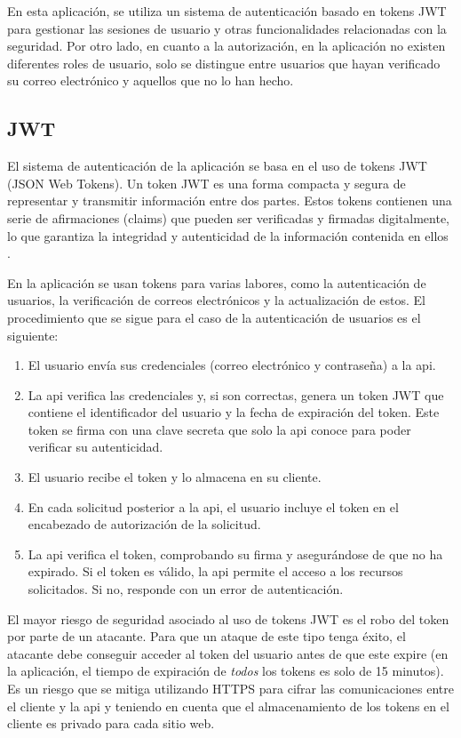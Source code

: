 En esta aplicación, se utiliza un sistema de autenticación basado en tokens JWT para gestionar las
sesiones de usuario y otras funcionalidades relacionadas con la seguridad. Por otro lado, en
cuanto a la autorización, en la aplicación no existen diferentes roles de usuario, solo se
distingue entre usuarios que hayan verificado su correo electrónico y aquellos que no lo han hecho.

\subsection{JWT}
\label{anexo4:sec:jwt}
El sistema de autenticación de la aplicación se basa en el uso de tokens JWT (JSON Web Tokens).
Un token JWT es una forma compacta y segura de representar y transmitir información entre dos
partes. Estos tokens contienen una serie de afirmaciones (claims) que pueden ser verificadas y
firmadas digitalmente, lo que garantiza la integridad y autenticidad de la información contenida
en ellos \parencite{rfc7519}.

En la aplicación se usan tokens para varias labores, como la autenticación de usuarios, la
verificación de correos electrónicos y la actualización de estos. El procedimiento que se sigue
para el caso de la autenticación de usuarios es el siguiente:
\begin{enumerate}
    \item El usuario envía sus credenciales (correo electrónico y contraseña) a la \gls{api}.
    \item La \gls{api} verifica las credenciales y, si son correctas, genera un token JWT que contiene
          el identificador del usuario y la fecha de expiración del token. Este token se firma
          con una clave secreta que solo la \gls{api} conoce para poder verificar su autenticidad.
    \item El usuario recibe el token y lo almacena en su cliente.
    \item En cada solicitud posterior a la \gls{api}, el usuario incluye el token en el encabezado de
          autorización de la solicitud.
    \item La \gls{api} verifica el token, comprobando su firma y asegurándose de que no ha expirado. Si
          el token es válido, la \gls{api} permite el acceso a los recursos solicitados. Si no, responde
          con un error de autenticación.
\end{enumerate}

El mayor riesgo de seguridad asociado al uso de tokens JWT es el robo del token
por parte de un atacante. Para que un ataque de este tipo tenga éxito, el
atacante debe conseguir acceder al token del usuario antes de que este expire
(en la aplicación, el tiempo de expiración de \textit{todos} los tokens es solo
de 15 minutos). Es un riesgo que se mitiga utilizando HTTPS para cifrar las
comunicaciones entre el cliente y la \gls{api} y teniendo en cuenta que el
almacenamiento de los tokens en el cliente es privado para cada sitio web.

